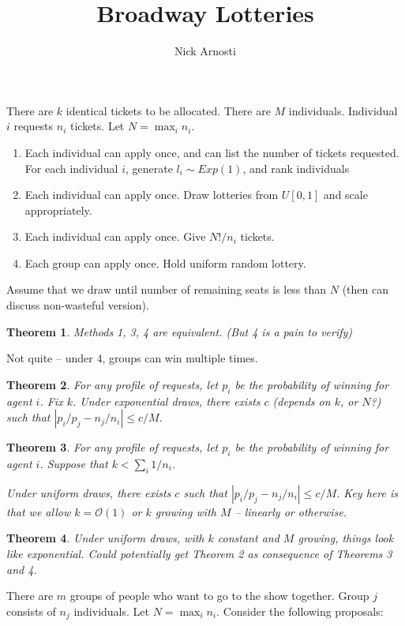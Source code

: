 \documentclass[11pt, oneside]{article}   	%
\title{Broadway Lotteries}
\author{Nick Arnosti}
\date{}							%
\newtheorem{theorem}{Theorem}
\newcommand{\na}[1]{{\color{blue} #1}}
\begin{document}
\maketitle

\onehalfspacing

There are $k$ identical tickets to be allocated. There are $M$ individuals. Individual $i$ requests $n_i$ tickets. Let $N = \max_i n_i$. 

\begin{enumerate}
\item Each individual can apply once, and can list the number of tickets requested. For each individual $i$, generate $l_i \sim Exp(1)$, and rank individuals 
\item Each individual can apply once. Draw lotteries from $U[0,1]$ and scale appropriately.
\item Each individual can apply once. Give $N!/n_i$ tickets.
\item Each group can apply once. Hold uniform random lottery. 
\end{enumerate}
\na{Assume that we draw until number of remaining seats is less than $N$ (then can discuss non-wasteful version).}


\begin{theorem}
Methods 1, 3, 4 are equivalent. (But 4 is a pain to verify)
\end{theorem}

\na{Not quite -- under 4, groups can win multiple times.}

\begin{theorem}
For any profile of requests, let $p_i$ be the probability of winning for agent $i$.  Fix $k$. Under exponential draws, there exists $c$ (depends on $k$, or $N$?) such that $|p_i/p_j - n_j/n_i| \leq c/M$.
\end{theorem}

\begin{theorem}
For any profile of requests, let $p_i$ be the probability of winning for agent $i$. Suppose that $k < \sum_i 1/n_i$. 

Under uniform draws, there exists $c$ such that $|p_i/p_j - n_j/n_i| \leq c/M$. \na{Key here is that we allow $k = \mathcal{O}(1)$ or $k$ growing with $M$ -- linearly or otherwise.}
\end{theorem}

\begin{theorem}
Under uniform draws, with $k$ constant and $M$ growing, things look like exponential. Could potentially get Theorem 2 as consequence of Theorems 3 and 4.
\end{theorem}



There are $m$ groups of people who want to go to the show together. Group $j$ consists of $n_j$ individuals. Let $N = \max_i n_i$. Consider the following proposals:
\end{document}
